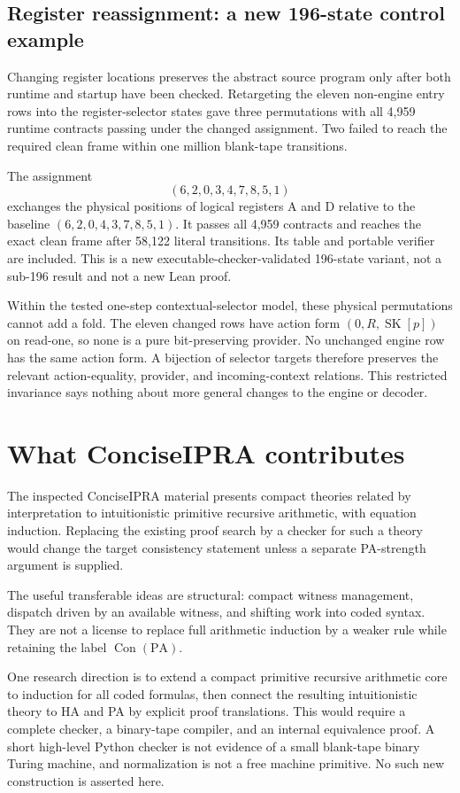 \documentclass[11pt,a4paper]{article}
\newcommand{\PA}{\mathrm{PA}}
\newcommand{\Con}{\operatorname{Con}}
\begin{document}
\subsection{Register reassignment: a new 196-state control example}

Changing register locations preserves the abstract source program only after both runtime and startup have been checked. Retargeting the eleven non-engine entry rows into the register-selector states gave three permutations with all 4,959 runtime contracts passing under the changed assignment. Two failed to reach the required clean frame within one million blank-tape transitions.

The assignment
\[
(6,2,0,3,4,7,8,5,1)
\]
exchanges the physical positions of logical registers A and D relative to the baseline $(6,2,0,4,3,7,8,5,1)$. It passes all 4,959 contracts and reaches the exact clean frame after 58,122 literal transitions. Its table and portable verifier are included. This is a new executable-checker-validated 196-state variant, not a sub-196 result and not a new Lean proof.

Within the tested one-step contextual-selector model, these physical permutations cannot add a fold. The eleven changed rows have action form $(0,R,\operatorname{SK}[p])$ on read-one, so none is a pure bit-preserving provider. No unchanged engine row has the same action form. A bijection of selector targets therefore preserves the relevant action-equality, provider, and incoming-context relations. This restricted invariance says nothing about more general changes to the engine or decoder.

\section{What ConciseIPRA contributes}

The inspected ConciseIPRA material presents compact theories related by interpretation to intuitionistic primitive recursive arithmetic, with equation induction. Replacing the existing proof search by a checker for such a theory would change the target consistency statement unless a separate PA-strength argument is supplied.

The useful transferable ideas are structural: compact witness management, dispatch driven by an available witness, and shifting work into coded syntax. They are not a license to replace full arithmetic induction by a weaker rule while retaining the label $\Con(\PA)$.

One research direction is to extend a compact primitive recursive arithmetic core to induction for all coded formulas, then connect the resulting intuitionistic theory to HA and PA by explicit proof translations. This would require a complete checker, a binary-tape compiler, and an internal equivalence proof. A short high-level Python checker is not evidence of a small blank-tape binary Turing machine, and normalization is not a free machine primitive. No such new construction is asserted here.
\end{document}
